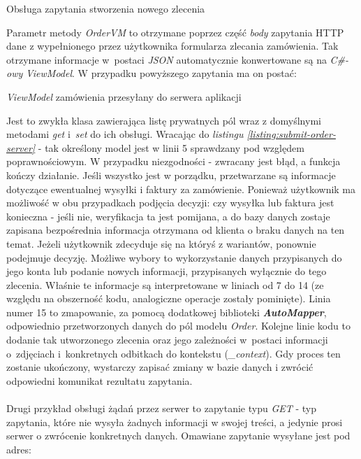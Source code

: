 \begin{listing}[ht]
    \caption{Obsługa zapytania stworzenia nowego zlecenia}
    \label{listing:submit-order-server}
\end{listing}

\noindent Parametr metody \textit{OrderVM} to otrzymane poprzez część \textit{body} zapytania HTTP dane z wypełnionego przez użytkownika formularza zlecania zamówienia. Tak otrzymane informacje w~postaci \textit{JSON} automatycznie konwertowane są na \textit{C\#-owy} \textit{ViewModel}. W przypadku powyższego zapytania ma on postać: 

\begin{listing}[ht]
    \caption{\textit{ViewModel} zamówienia przesyłany do serwera aplikacji}
    \label{listing:viewmodel-order-server}
\end{listing}

\noindent Jest to zwykła klasa zawierająca listę prywatnych pól wraz z domyślnymi metodami \textit{get} i~\textit{set} do ich obsługi. Wracając do \textit{listingu \ref{listing:submit-order-server}} - tak określony model jest w linii 5 sprawdzany pod względem poprawnościowym. W przypadku niezgodności - zwracany jest błąd, a funkcja kończy działanie. Jeśli wszystko jest w porządku, przetwarzane są informacje dotyczące ewentualnej wysyłki i faktury za zamówienie. Ponieważ użytkownik ma możliwość w obu przypadkach podjęcia decyzji: czy wysyłka lub faktura jest konieczna - jeśli nie, weryfikacja ta jest pomijana, a do bazy danych zostaje zapisana bezpośrednia informacja otrzymana od klienta o braku danych na ten temat. Jeżeli użytkownik zdecyduje się na któryś z wariantów, ponownie podejmuje decyzję. Możliwe wybory to wykorzystanie danych przypisanych do jego konta lub podanie nowych informacji, przypisanych wyłącznie do tego zlecenia. Właśnie te informacje są interpretowane w liniach od 7 do 14 (ze względu na obszerność kodu, analogiczne operacje zostały pominięte). Linia numer 15 to zmapowanie, za pomocą dodatkowej biblioteki \textit{\textbf{AutoMapper}}, odpowiednio przetworzonych danych do pól modelu \textit{Order}. Kolejne linie kodu to dodanie tak utworzonego zlecenia oraz jego zależności w~postaci informacji o~zdjęciach i~konkretnych odbitkach do kontekstu (\textit{\_context}). Gdy proces ten zostanie ukończony, wystarczy zapisać zmiany w bazie danych i zwrócić odpowiedni komunikat rezultatu zapytania.\\
\\
Drugi przykład obsługi żądań przez serwer to zapytanie typu \textit{GET} - typ zapytania, które nie wysyła żadnych informacji w swojej treści, a jedynie prosi serwer o zwrócenie konkretnych danych. Omawiane zapytanie wysyłane jest pod adres:

